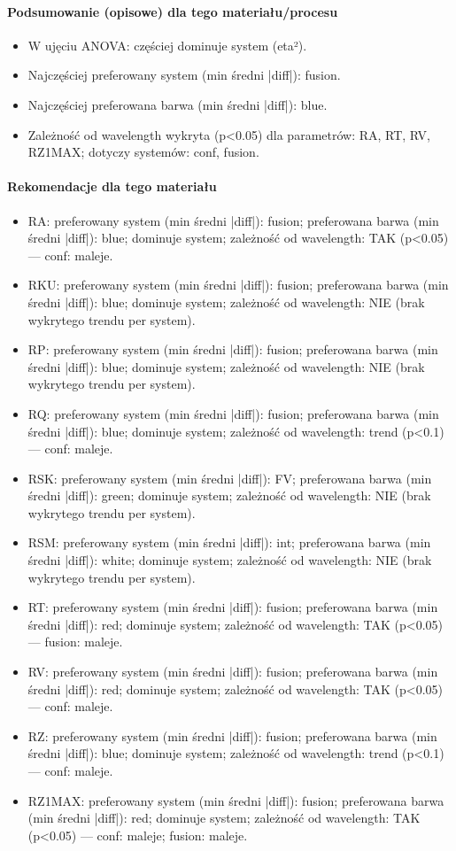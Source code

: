 \documentclass[
  10pt,
]{article}
\begin{document}
\paragraph{Podsumowanie (opisowe) dla tego materiału/procesu}
\begin{itemize}
\item W ujęciu ANOVA: częściej dominuje system (eta²).
\item Najczęściej preferowany system (min średni |diff|): fusion.
\item Najczęściej preferowana barwa (min średni |diff|): blue.
\item Zależność od wavelength wykryta (p<0.05) dla parametrów: RA, RT, RV, RZ1MAX; dotyczy systemów: conf, fusion.
\end{itemize}
\paragraph{Rekomendacje dla tego materiału}
\begin{itemize}
\item RA: preferowany system (min średni |diff|): fusion; preferowana barwa (min średni |diff|): blue; dominuje system; zależność od wavelength: TAK (p<0.05) — conf: maleje.
\item RKU: preferowany system (min średni |diff|): fusion; preferowana barwa (min średni |diff|): blue; dominuje system; zależność od wavelength: NIE (brak wykrytego trendu per system).
\item RP: preferowany system (min średni |diff|): fusion; preferowana barwa (min średni |diff|): blue; dominuje system; zależność od wavelength: NIE (brak wykrytego trendu per system).
\item RQ: preferowany system (min średni |diff|): fusion; preferowana barwa (min średni |diff|): blue; dominuje system; zależność od wavelength: trend (p<0.1) — conf: maleje.
\item RSK: preferowany system (min średni |diff|): FV; preferowana barwa (min średni |diff|): green; dominuje system; zależność od wavelength: NIE (brak wykrytego trendu per system).
\item RSM: preferowany system (min średni |diff|): int; preferowana barwa (min średni |diff|): white; dominuje system; zależność od wavelength: NIE (brak wykrytego trendu per system).
\item RT: preferowany system (min średni |diff|): fusion; preferowana barwa (min średni |diff|): red; dominuje system; zależność od wavelength: TAK (p<0.05) — fusion: maleje.
\item RV: preferowany system (min średni |diff|): fusion; preferowana barwa (min średni |diff|): red; dominuje system; zależność od wavelength: TAK (p<0.05) — conf: maleje.
\item RZ: preferowany system (min średni |diff|): fusion; preferowana barwa (min średni |diff|): blue; dominuje system; zależność od wavelength: trend (p<0.1) — conf: maleje.
\item RZ1MAX: preferowany system (min średni |diff|): fusion; preferowana barwa (min średni |diff|): red; dominuje system; zależność od wavelength: TAK (p<0.05) — conf: maleje; fusion: maleje.
\end{itemize}
\end{document}
